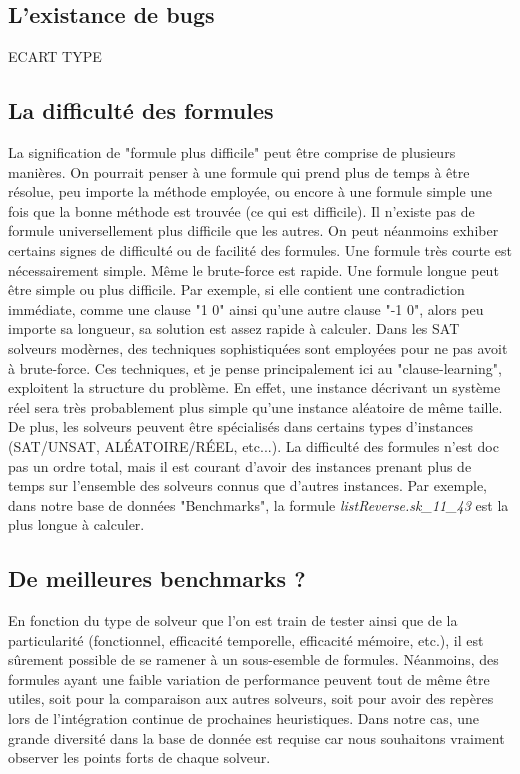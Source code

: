 \documentclass[11pt,a4paper]{article}
\begin{document}
\subsection{L'existance de bugs}
 
 
 ECART TYPE


\subsection{La difficulté des formules}

 La signification de "formule plus difficile" peut être comprise de plusieurs manières. On pourrait penser à une formule qui prend plus de temps à être résolue, peu importe la méthode employée, ou encore à une formule simple une fois que la bonne méthode est trouvée (ce qui est difficile). 
 Il n'existe pas de formule universellement plus difficile que les autres. On peut néanmoins exhiber certains signes de difficulté ou de facilité des formules. 
 Une formule très courte est nécessairement simple. Même le brute-force est rapide.
 Une formule longue peut être simple ou plus difficile. Par exemple, si elle contient une contradiction immédiate, comme une clause "1 0" ainsi qu'une autre clause "-1 0", alors peu importe sa longueur, sa solution est assez rapide à calculer. Dans les SAT solveurs modèrnes, des techniques sophistiquées sont employées pour ne pas avoit à brute-force. Ces techniques, et je pense principalement ici au "clause-learning", exploitent la structure du problème. En effet, une instance décrivant un système réel sera très probablement plus simple qu'une instance aléatoire de même taille. 
De plus, les solveurs peuvent être spécialisés dans certains types d'instances (SAT/UNSAT, ALÉATOIRE/RÉEL, etc...).
La difficulté des formules n'est doc pas un ordre total, mais il est courant d'avoir des instances prenant plus de temps sur l'ensemble des solveurs connus que d'autres instances. Par exemple, dans notre base de données "Benchmarks", la formule \textit{listReverse.sk\_11\_43} est la plus longue à calculer.



\subsection{De meilleures benchmarks ?}

En fonction du type de solveur que l'on est train de tester ainsi que de la particularité (fonctionnel, efficacité temporelle, efficacité mémoire, etc.), il est sûrement possible de se ramener à un sous-esemble de formules. Néanmoins, des formules ayant une faible variation de performance peuvent tout de même être utiles, soit pour la comparaison aux autres solveurs, soit pour avoir des repères lors de l'intégration continue de prochaines heuristiques. 
Dans notre cas, une grande diversité dans la base de donnée est requise car nous souhaitons vraiment observer les points forts de chaque solveur.
\end{document}

